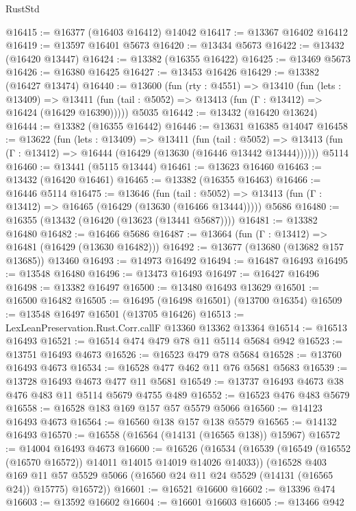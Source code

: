 \begin{lexlean}{RustStd}
\begin{coremodule}
@16415 := @16377 (@16403 @16412) @14042
@16417 := @13367 @16402 @16412
@16419 := @13597 @16401 @5673
@16420 := @13434 @5673
@16422 := @13432 (@16420 @13447)
@16424 := @13382 (@16355 @16422)
@16425 := @13469 @5673
@16426 := @16380 @16425
@16427 := @13453 @16426
@16429 := @13382 (@16427 @13474)
@16440 := @13600
    (fun (rty : @4551) =>
    @13410
      (fun (lets : @13409) =>
      @13411 (fun (tail : @5052) => @13413 (fun (Γ : @13412) => @16424 (@16429 @16390)))))
    @5035
@16442 := @13432 (@16420 @13624)
@16444 := @13382 (@16355 @16442)
@16446 := @13631 @16385 @14047
@16458 := @13622
    (fun (lets : @13409) =>
    @13411
      (fun (tail : @5052) =>
      @13413 (fun (Γ : @13412) => @16444 (@16429 (@13630 (@16446 @13442 @13444))))))
    @5114
@16460 := @13441 (@5115 @13444)
@16461 := @13623 @16460
@16463 := @13432 (@16420 @16461)
@16465 := @13382 (@16355 @16463)
@16466 := @16446 @5114
@16475 := @13646
    (fun (tail : @5052) => @13413 (fun (Γ : @13412) => @16465 (@16429 (@13630 (@16466 @13444)))))
    @5686
@16480 := @16355 (@13432 (@16420 (@13623 (@13441 @5687))))
@16481 := @13382 @16480
@16482 := @16466 @5686
@16487 := @13664 (fun (Γ : @13412) => @16481 (@16429 (@13630 @16482)))
@16492 := @13677 (@13680 (@13682 @157 @13685)) @13460
@16493 := @14973 @16492
@16494 := @16487 @16493
@16495 := @13548 @16480
@16496 := @13473 @16493
@16497 := @16427 @16496
@16498 := @13382 @16497
@16500 := @13480 @16493 @13629
@16501 := @16500 @16482
@16505 := @16495 (@16498 @16501) (@13700 @16354)
@16509 := @13548 @16497 @16501 (@13705 @16426)
@16513 := LexLeanPreservation.Rust.Corr.callF @13360 @13362 @13364
@16514 := @16513 @16493
@16521 := @16514 @474 @479 @78 @11 @5114 @5684 @942
@16523 := @13751 @16493 @4673
@16526 := @16523 @479 @78 @5684
@16528 := @13760 @16493 @4673
@16534 := @16528 @477 @462 @11 @76 @5681 @5683
@16539 := @13728 @16493 @4673 @477 @11 @5681
@16549 := @13737 @16493 @4673 @38 @476 @483 @11 @5114 @5679 @4755 @489
@16552 := @16523 @476 @483 @5679
@16558 := @16528 @183 @169 @157 @57 @5579 @5066
@16560 := @14123 @16493 @4673
@16564 := @16560 @138 @157 @138 @5579
@16565 := @14132 @16493
@16570 := @16558 (@16564 (@14131 (@16565 @138)) @15967)
@16572 := @14004 @16493 @4673
@16600 := @16526
    (@16534
      (@16539 (@16549 (@16552 (@16570 @16572)) @14011 @14015 @14019 @14026 @14033))
      (@16528
        @403
        @169
        @11
        @57
        @5529
        @5066
        (@16560 @24 @11 @24 @5529 (@14131 (@16565 @24)) @15775)
        @16572))
@16601 := @16521 @16600
@16602 := @13396 @474
@16603 := @13592 @16602
@16604 := @16601 @16603
@16605 := @13466 @942

\end{coremodule}
\end{lexlean}
